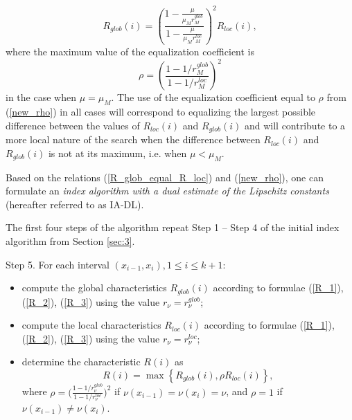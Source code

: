\documentclass[twocolumn]{svjour3}          %
\begin{document}
\begin{equation}\label{R_glob_equal_R_loc}
	R_{glob}(i) = \left( \frac{1-\frac{\mu}{\mu_M r_M^{glob}}}{1-\frac{\mu}{\mu_M r_M^{loc}}} \right)^2 R_{loc}(i),
\end{equation}
where the maximum value of the equalization coefficient is 
\begin{equation}\label{new_rho}
\rho=\left(\frac{1-1/r_{M}^{glob}}{1-1/r_{M}^{loc}}\right)^2 
\end{equation}
in the case when $\mu = \mu_M$. %
The use of the equalization coefficient equal to $\rho$ from (\ref{new_rho}) in all cases will correspond to equalizing the largest possible difference between the values of $R_{loc}(i)$ and $R_{glob}(i)$ and will contribute to a more local nature of the search when the difference between $R_{loc}(i)$ and $R_{glob}(i)$ is not at its maximum, i.e. when $\mu < \mu_M$.


Based on the relations (\ref{R_glob_equal_R_loc}) and (\ref{new_rho}), one can formulate an \textit{index algorithm with a dual estimate of the Lipschitz constants} (hereafter referred to as IA-DL).


	
	The first four steps of the algorithm repeat Step 1 -- Step 4 of the initial index algorithm from Section \ref{sec:3}.
	
	Step 5. For each interval $(x_{i-1}, x_i), 1 \leq i \leq k+1$: 
\begin{flushleft}
	\begin{itemize}
		\item compute the global characteristics $R_{glob}(i)$ according to formulae (\ref{R_1}), (\ref{R_2}), (\ref{R_3}) using the value $r_{\nu}=r_{\nu}^{glob}$;
		\item compute the local characteristics $R_{loc}(i)$ according to formulae (\ref{R_1}), (\ref{R_2}), (\ref{R_3}) using the value $r_{\nu}=r_{\nu}^{loc}$;
		\item determine the characteristic $R(i)$ as
\begin{equation}\label{R_max}
	R(i) = \max{\left\{ R_{glob}(i), \rho R_{loc}(i) \right\}},
\end{equation}
where $\rho=\Big(\frac{1-1/r_{\nu}^{glob}}{1-1/r_{\nu}^{loc}}\Big)^2$ if $\nu(x_{i-1})=\nu(x_i)=\nu$, and $\rho=1$ if $\nu(x_{i-1}) \neq \nu(x_i)$.
	\end{itemize}
\end{flushleft}
\end{document}
